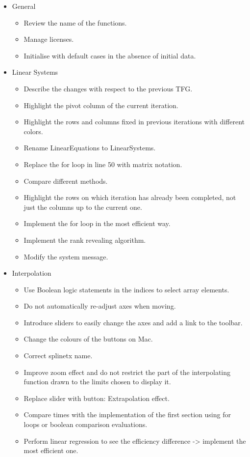 \begin{itemize}
\item General
\begin{itemize}
\item Review the name of the functions.
\item Manage licenses.
\item Initialise with default cases in the absence of initial data.
\end{itemize}
\item Linear Systems
\begin{itemize}
    \item Describe the changes with respect to the previous TFG.
    \item Highlight the pivot column of the current iteration.
    \item Highlight the rows and columns fixed in previous iterations with different colors.
    \item Rename LinearEquations to LinearSystems.
    \item Replace the for loop in line 50 with matrix notation.
    \item Compare different methods.
    \item Highlight the rows on which iteration has already been completed, not just the columns up to the current one.
    \item Implement the for loop in the most efficient way.
    \item Implement the rank revealing algorithm.
    \item Modify the system message.
\end{itemize}

\item Interpolation
\begin{itemize}
    \item Use Boolean logic statements in the indices to select array elements.
    \item Do not automatically re-adjust axes when moving.
    \item Introduce sliders to easily change the axes and add a link to the toolbar.
    \item Change the colours of the buttons on Mac.
    \item Correct splinetx name.
    \item Improve zoom effect and do not restrict the part of the interpolating function drawn to the limits chosen to display it.
    \item Replace slider with button: Extrapolation effect.
    \item Compare times with the implementation of the first section using for loops or boolean comparison evaluations.
    \item Perform linear regression to see the efficiency difference -> implement the most efficient one.
\end{itemize}


\end{itemize}
